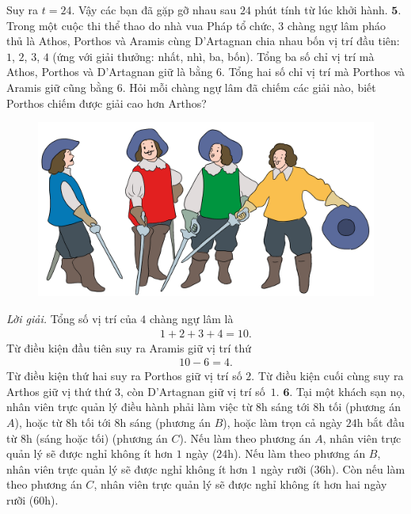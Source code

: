 \begin{multicols}{2}
\begin{figure}[H]
	\end{figure}
	Suy ra $t=24$.
	Vậy các bạn đã gặp gỡ nhau sau $24$ phút tính từ lúc khởi hành.
	\vskip 0.1cm
	$\pmb{5.}$ Trong một cuộc thi thể thao do nhà vua Pháp tổ chức, $3$ chàng ngự lâm pháo thủ là Athos, Porthos và Aramis cùng D'Artagnan chia nhau bốn vị trí đầu tiên: $1$, $2$, $3$, $4$ (ứng với giải thưởng: nhất, nhì, ba, bốn). Tổng ba số chỉ vị trí mà Athos, Porthos và D'Artagnan giữ là bằng $6$. Tổng hai số chỉ vị trí mà Porthos và Aramis giữ cũng bằng $6$. Hỏi mỗi chàng ngự lâm đã chiếm các giải nào, biết Porthos chiếm được giải cao hơn Arthos?
	\begin{figure}[H]
		\centering
		\vspace*{-5pt}
		\captionsetup{labelformat= empty, justification=centering}
		\includegraphics[width=1\linewidth]{Pi3_bai5}
		\vspace*{-15pt}
	\end{figure}
	\textit{Lời giải.} 	Tổng số vị trí của $4$ chàng ngự lâm là 
	\begin{align*}
		1+2+3+4 =10.
	\end{align*} 
	Từ điều kiện đầu tiên suy ra Aramis giữ vị trí thứ 
	\begin{align*}
		10-6 = 4.
	\end{align*}
	Từ điều kiện thứ hai suy ra Porthos giữ vị trí số $2$. Từ điều kiện cuối cùng suy ra Arthos giữ vị thứ thứ $3$, còn D'Artagnan giữ vị trí số~$1$.
	\vskip 0.1cm
	$\pmb{6.}$ Tại một khách sạn nọ, nhân viên trực quản lý điều hành phải làm việc từ $8$h sáng tới $8$h tối (phương án $A$), hoặc từ $8$h tối tới $8$h sáng (phương án $B$), hoặc làm trọn cả ngày $24$h bắt đầu từ $8$h (sáng hoặc tối) (phương án $C$). Nếu làm theo phương án $A$, nhân viên trực quản lý sẽ được nghỉ không ít hơn $1$ ngày ($24$h). Nếu làm theo phương án $B$, nhân viên trực quản lý sẽ được nghỉ không ít hơn $1$ ngày rưỡi ($36$h). Còn nếu làm theo phương án $C$, nhân viên trực quản lý sẽ được nghỉ không ít hơn hai ngày rưỡi ($60$h).

\end{multicols}
